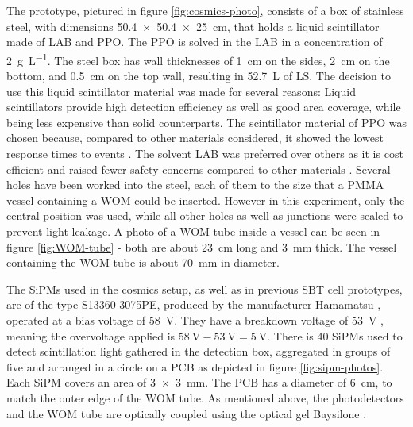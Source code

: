 The prototype, pictured in figure \ref{fig:cosmics-photo}, consists of a box of stainless steel, with dimensions \break \SI{50.4 x 50.4 x 25}{\centi\meter}, that holds a liquid scintillator made of \ac{LAB} and \ac{PPO}. The \ac{PPO} is solved in the \ac{LAB} in a concentration of \SI{2}{\gram\per\liter}.
The steel box has wall thicknesses of \SI{1}{\centi\meter} on the sides, \SI{2}{\centi\meter} on the bottom, and \SI{0.5}{\centi\meter} on the top wall, resulting in \SI{52.7}{\liter} of \ac{LS}.
The decision to use this liquid scintillator material was made for several reasons: Liquid scintillators provide high detection efficiency as well as good area coverage, while being less expensive than solid counterparts. The scintillator material of \ac{PPO} was chosen because, compared to other materials considered, it showed the lowest response times to events \cite{ZIMMERMANN}. The solvent \ac{LAB} was preferred over others as it is cost efficient \cite{SHIP-DESIGN-2019} and raised fewer safety concerns compared to other materials \cite{ZIMMERMANN}.
Several holes have been worked into the steel, each of them to the size that a \ac{PMMA} vessel containing a \ac{WOM} could be inserted. However in this experiment, only the central position was used, while all other holes as well as junctions were sealed to prevent light leakage.
A photo of a \ac{WOM} tube inside a vessel can be seen in figure \ref{fig:WOM-tube} - both are about \SI{23}{\centi\meter} long and \SI{3}{\milli\meter} thick. The vessel containing the \ac{WOM} tube is about \SI{70}{\milli\meter} in diameter.


The \acsp{SiPM} used in the cosmics setup, as well as in previous \ac{SBT} cell prototypes, are of the type S13360-3075PE, produced by the manufacturer Hamamatsu \cite{HAMAMATSU}, operated at a bias voltage of \SI{58}{\volt}. They have a breakdown voltage of \SI{53}{\volt} \cite{HAMAMATSU}, meaning the overvoltage applied is $\SI{58}{\volt} - \SI{53}{\volt} = \SI{5}{\volt}$. There is 40 \acsp{SiPM} used to detect scintillation light gathered in the detection box, aggregated in groups of five and arranged in a circle on a \ac{PCB} as depicted in figure \ref{fig:sipm-photos}. Each \ac{SiPM} covers an area of \SI{3x3}{\milli\meter}. The \ac{PCB} has a diameter of \SI{6}{\centi\meter}, to match the outer edge of the \ac{WOM} tube. As mentioned above, the photodetectors and the \ac{WOM} tube are optically coupled using the optical gel Baysilone \cite{ZACHARIAS}.





